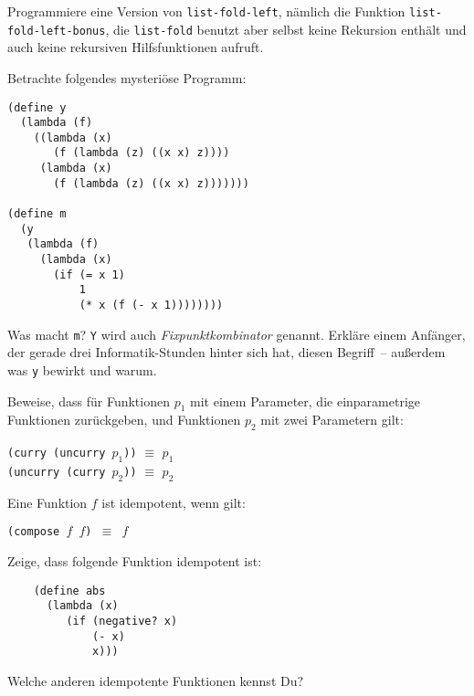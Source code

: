 \begin{aufgabe}
  Programmiere eine Version von
  \texttt{list-fold-left}, nämlich die Funktion
  \texttt{list-fold-left-bonus}, die \texttt{list-fold} benutzt aber
  selbst keine Rekursion enthält und auch keine rekursiven
  Hilfsfunktionen aufruft.
\end{aufgabe}


\begin{aufgabe}
  Betrachte folgendes mysteriöse Programm:
  \begin{lstlisting}
(define y
  (lambda (f)
    ((lambda (x)
       (f (lambda (z) ((x x) z))))
     (lambda (x)
       (f (lambda (z) ((x x) z)))))))

(define m
  (y
   (lambda (f)
     (lambda (x)
       (if (= x 1)
           1
           (* x (f (- x 1))))))))
   \end{lstlisting}
   Was macht \texttt{m}?  \texttt{Y} wird auch
   \textit{Fixpunktkombinator} genannt.  Erkläre einem Anfänger, der
   gerade drei Informatik-Stunden hinter sich hat, diesen Begriff~--
   außerdem was
   \texttt{y} bewirkt und warum.
 \end{aufgabe}

\begin{aufgabe}
  Beweise, dass für Funktionen $p_1$ mit einem Parameter, die
  einparametrige Funktionen zurückgeben, und Funktionen $p_2$ mit zwei
  Parametern gilt:
  \begin{center}
    \texttt{(curry (uncurry $p_1$))} $\equiv$ $p_1$\\
    \texttt{(uncurry (curry $p_2$))} $\equiv$ $p_2$
  \end{center}
 \end{aufgabe}

\begin{aufgabe}
  Eine Funktion $f$ ist idempotent, wenn gilt:

  \begin{center}
    \texttt{(compose $f$ $f$) $\equiv$ $f$}
  \end{center}

  Zeige, dass folgende Funktion idempotent ist:

  \begin{lstlisting}
    (define abs
      (lambda (x)
         (if (negative? x)
             (- x)
             x)))  \end{lstlisting}

  Welche anderen idempotente Funktionen kennst Du?
\end{aufgabe}


